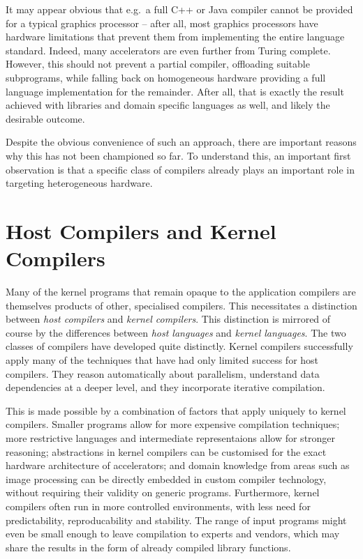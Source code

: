     It may appear obvious that e.g.\ a full C++ or Java compiler cannot be
    provided for a typical graphics processor -- after all, most graphics
    processors have hardware limitations that prevent them from implementing the
    entire language standard.
    Indeed, many accelerators are even further from Turing complete.
    However, this should not prevent a partial compiler, offloading suitable
    subprograms, while falling back on homogeneous hardware providing a full
    language implementation for the remainder.
    After all, that is exactly the result achieved with libraries and domain
    specific languages as well, and likely the desirable outcome.

    Despite the obvious convenience of such an approach, there are important
    reasons why this has not been championed so far.
    To understand this, an important first observation is that a specific class
    of compilers already plays an important role in targeting heterogeneous
    hardware.

\section{Host Compilers and Kernel Compilers}

    Many of the kernel programs that remain opaque to the application compilers
    are themselves products of other, specialised compilers.
    This necessitates a distinction between {\em host compilers} and {\em kernel
    compilers}.
    This distinction is mirrored of course by the differences between {\em host
    languages} and {\em kernel languages}.
    The two classes of compilers have developed quite distinctly.
    Kernel compilers successfully apply many of the techniques that have had
    only limited success for host compilers.
    They reason automatically about parallelism, understand data dependencies at
    a deeper level, and they incorporate iterative compilation.

    This is made possible by a combination of factors that apply uniquely to
    kernel compilers.
    Smaller programs allow for more expensive compilation techniques;
    more restrictive languages and intermediate representaions allow for
    stronger reasoning;
    abstractions in kernel compilers can be customised for the exact hardware
    architecture of accelerators;
    and domain knowledge from areas such as image processing can be directly
    embedded in custom compiler technology, without requiring their validity
    on generic programs.
    Furthermore, kernel compilers often run in more controlled environments,
    with less need for predictability, reproducability and stability.
    The range of input programs might even be small enough to leave compilation
    to experts and vendors, which may share the results in the form of already
    compiled library functions.

